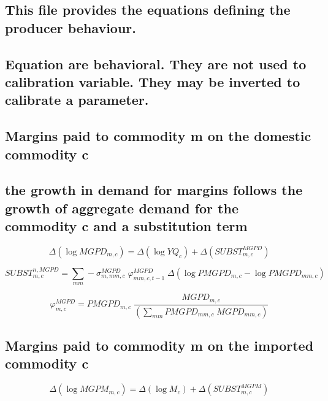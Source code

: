 \documentclass[12pt]{article}
\numberwithin{equation}{section}
\begin{document}
\subsection{This file provides the equations defining the producer behaviour.}




\subsection{Equation are behavioral. They are not used to calibration variable. They may be inverted to calibrate a parameter.}





\subsection{Margins paid to commodity m on the domestic commodity c}




\subsection{the growth in demand for margins follows the growth of aggregate demand for the commodity c and a substitution term}


\begin{dmath}
\varDelta \left(\operatorname{log} MGPD_{m, c}\right) = \varDelta \left(\operatorname{log} YQ_{c}\right) + \varDelta \left(SUBST^{MGPD}_{m, c}\right)
\end{dmath}

\begin{dmath}
SUBST^{n,MGPD}_{m, c} = \sum_{mm} -\sigma^{MGPD}_{m, mm, c} \; \varphi^{MGPD}_{mm, c, t-1} \; \varDelta \left(\operatorname{log} PMGPD_{m, c} - \operatorname{log} PMGPD_{mm, c}\right)
\end{dmath}

\begin{dmath}
\varphi^{MGPD}_{m, c} = PMGPD_{m, c} \; \frac{MGPD_{m, c}}{\left( \sum_{mm} PMGPD_{mm, c} \; MGPD_{mm, c} \right)}
\end{dmath}



\subsection{Margins paid to commodity m on the imported commodity c}


\begin{dmath}
\varDelta \left(\operatorname{log} MGPM_{m, c}\right) = \varDelta \left(\operatorname{log} M_{c}\right) + \varDelta \left(SUBST^{MGPM}_{m, c}\right)
\end{dmath}
\end{document}
